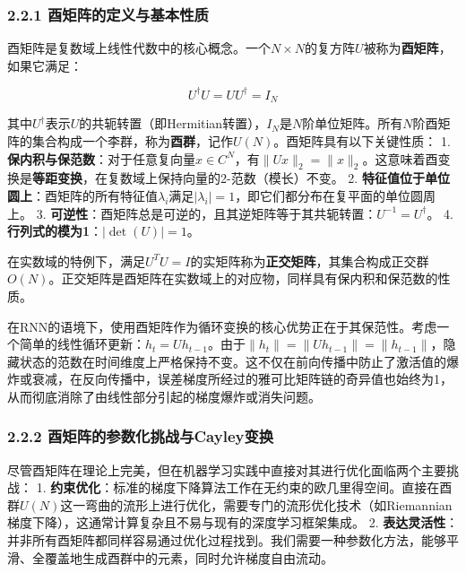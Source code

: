 \documentclass[
  12pt,
]{article}
\begin{document}
\hypertarget{ux9149ux77e9ux9635ux7684ux5b9aux4e49ux4e0eux57faux672cux6027ux8d28}{%
\subsubsection{2.2.1
酉矩阵的定义与基本性质}\label{ux9149ux77e9ux9635ux7684ux5b9aux4e49ux4e0eux57faux672cux6027ux8d28}}

酉矩阵是复数域上线性代数中的核心概念。一个\(N \times N\)的复方阵\(U\)被称为\textbf{酉矩阵}，如果它满足：

\[
U^\dagger U = U U^\dagger = I_N
\]

其中\(U^\dagger\)表示\(U\)的共轭转置（即Hermitian转置），\(I_N\)是\(N\)阶单位矩阵。所有\(N\)阶酉矩阵的集合构成一个李群，称为\textbf{酉群}，记作\(U(N)\)。酉矩阵具有以下关键性质：
1.
\textbf{保内积与保范数}：对于任意复向量\(x \in C^N\)，有\(\|Ux\|_2 = \|x\|_2\)。这意味着酉变换是\textbf{等距变换}，在复数域上保持向量的2-范数（模长）不变。
2.
\textbf{特征值位于单位圆上}：酉矩阵的所有特征值\(\lambda_i\)满足\(|\lambda_i| = 1\)，即它们都分布在复平面的单位圆周上。
3.
\textbf{可逆性}：酉矩阵总是可逆的，且其逆矩阵等于其共轭转置：\(U^{-1} = U^\dagger\)。
4. \textbf{行列式的模为1}：\(|\det(U)| = 1\)。

在实数域的特例下，满足\(U^T U = I\)的实矩阵称为\textbf{正交矩阵}，其集合构成正交群\(O(N)\)。正交矩阵是酉矩阵在实数域上的对应物，同样具有保内积和保范数的性质。

在RNN的语境下，使用酉矩阵作为循环变换的核心优势正在于其保范性。考虑一个简单的线性循环更新：\(h_t = U h_{t-1}\)。由于\(\|h_t\| = \|U h_{t-1}\| = \|h_{t-1}\|\)，隐藏状态的范数在时间维度上严格保持不变。这不仅在前向传播中防止了激活值的爆炸或衰减，在反向传播中，误差梯度所经过的雅可比矩阵链的奇异值也始终为1，从而彻底消除了由线性部分引起的梯度爆炸或消失问题。

\hypertarget{ux9149ux77e9ux9635ux7684ux53c2ux6570ux5316ux6311ux6218ux4e0ecayleyux53d8ux6362}{%
\subsubsection{2.2.2
酉矩阵的参数化挑战与Cayley变换}\label{ux9149ux77e9ux9635ux7684ux53c2ux6570ux5316ux6311ux6218ux4e0ecayleyux53d8ux6362}}

尽管酉矩阵在理论上完美，但在机器学习实践中直接对其进行优化面临两个主要挑战：
1.
\textbf{约束优化}：标准的梯度下降算法工作在无约束的欧几里得空间。直接在酉群\(U(N)\)这一弯曲的流形上进行优化，需要专门的流形优化技术（如Riemannian梯度下降），这通常计算复杂且不易与现有的深度学习框架集成。
2.
\textbf{表达灵活性}：并非所有酉矩阵都同样容易通过优化过程找到。我们需要一种参数化方法，能够平滑、全覆盖地生成酉群中的元素，同时允许梯度自由流动。
\end{document}
